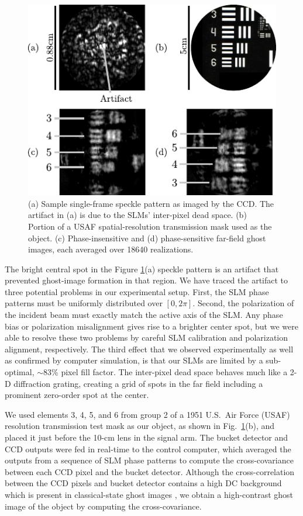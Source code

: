 \begin{figure}[htb]
\centerline{\includegraphics[width=12cm]{figure-ghost-usaf.pdf}}
\caption{(a) Sample single-frame speckle pattern as imaged by the CCD. The artifact in (a) is due to the SLMs' inter-pixel dead space. (b) Portion of a USAF spatial-resolution transmission mask used as the object. (c) Phase-insensitive and (d) phase-sensitive far-field ghost images, each averaged over 18640 realizations.}
\label{figure:ghost-usaf}
\end{figure}

The bright central spot in the Figure \ref{figure:ghost-usaf}(a) speckle pattern is an artifact that prevented ghost-image formation in that region.  We have traced the artifact to three potential problems in our experimental setup. First, the SLM phase patterns must be uniformly distributed over $[0,2\pi]$. Second, the polarization of the incident beam must exactly match the active axis of the SLM.  Any phase bias or polarization misalignment gives rise to a brighter center spot, but we were able to resolve these two problems by careful SLM calibration and polarization alignment, respectively. The third effect that we observed experimentally as well as confirmed by computer simulation, is that our SLMs are limited by a sub-optimal, $\sim$83\% pixel fill factor. The inter-pixel dead space behaves much like a 2-D diffraction grating, creating a grid of spots in the far field including a prominent zero-order spot at the center.

We used elements 3, 4, 5, and 6 from group 2 of a 1951 U.S.\ Air Force (USAF) resolution transmission test mask as our object, as shown in Fig.~\ref{figure:ghost-usaf}(b), and placed it just before the 10-cm lens in the signal arm.  The bucket detector and CCD outputs were fed in real-time to the control computer, which averaged the outputs from a sequence of SLM phase patterns to compute the cross-covariance between each CCD pixel and the bucket detector. Although the cross-correlation between the CCD pixels and bucket detector contains a high DC background which is present in classical-state ghost images \cite{erkmen-unified,erkmen-from}, we obtain a high-contrast ghost image of the object by computing the cross-covariance.


